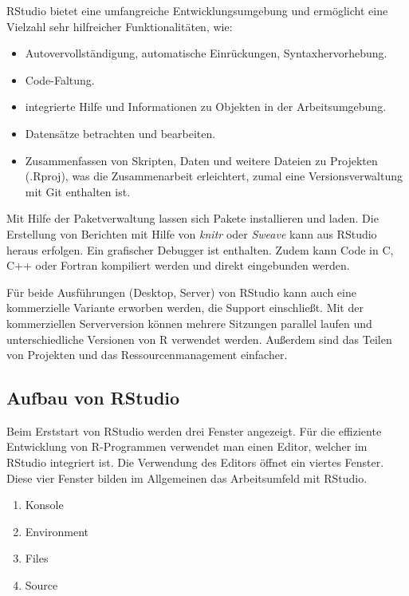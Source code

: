 \documentclass[]{article}
\providecommand{\tightlist}{%
  \setlength{\itemsep}{0pt}\setlength{\parskip}{0pt}}
\begin{document}
RStudio bietet eine umfangreiche Entwicklungsumgebung und ermöglicht
eine Vielzahl sehr hilfreicher Funktionalitäten, wie:

\begin{itemize}
\tightlist
\item
  Autovervollständigung, automatische Einrückungen, Syntaxhervorhebung.
\item
  Code-Faltung.
\item
  integrierte Hilfe und Informationen zu Objekten in der
  Arbeitsumgebung.
\item
  Datensätze betrachten und bearbeiten.
\item
  Zusammenfassen von Skripten, Daten und weitere Dateien zu Projekten
  (.Rproj), was die Zusammenarbeit erleichtert, zumal eine
  Versionsverwaltung mit Git enthalten ist.
\end{itemize}

Mit Hilfe der Paketverwaltung lassen sich Pakete installieren und laden.
Die Erstellung von Berichten mit Hilfe von \emph{knitr} oder
\emph{Sweave} kann aus RStudio heraus erfolgen. Ein grafischer Debugger
ist enthalten. Zudem kann Code in C, C++ oder Fortran kompiliert werden
und direkt eingebunden werden.

Für beide Ausführungen (Desktop, Server) von RStudio kann auch eine
kommerzielle Variante erworben werden, die Support einschließt. Mit der
kommerziellen Serverversion können mehrere Sitzungen parallel laufen und
unterschiedliche Versionen von R verwendet werden. Außerdem sind das
Teilen von Projekten und das Ressourcenmanagement einfacher.

\subsection*{Aufbau von RStudio}\label{aufbau-von-rstudio}

Beim Erststart von RStudio werden drei Fenster angezeigt. Für die
effiziente Entwicklung von R-Programmen verwendet man einen Editor,
welcher im RStudio integriert ist. Die Verwendung des Editors öffnet ein
viertes Fenster. Diese vier Fenster bilden im Allgemeinen das
Arbeitsumfeld mit RStudio.

\begin{enumerate}
\def\labelenumi{\arabic{enumi}.}
\tightlist
\item
  Konsole
\item
  Environment
\item
  Files
\item
  Source
\end{enumerate}
\end{document}
